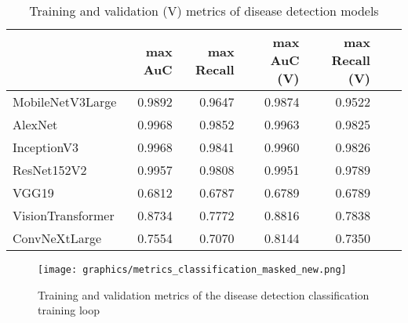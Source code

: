 \documentclass[draft,final]{vutinfth} %
\begin{document}
\begin{appendix}
\begin{table}[]
    \centering
    \begin{tabular}{lrrrrrr}
    \toprule
    & max AuC & max Recall & max AuC (V) & max Recall (V) \\
    \midrule
    MobileNetV3Large & 0.9892 & 0.9647 & 0.9874 & 0.9522 \\
    AlexNet & 0.9968 & 0.9852 & 0.9963 & 0.9825 \\
    InceptionV3 & 0.9968 & 0.9841 & 0.9960 & 0.9826 \\
    ResNet152V2 & 0.9957 & 0.9808 & 0.9951 & 0.9789 \\
    VGG19 & 0.6812 & 0.6787 & 0.6789 & 0.6789 \\
    VisionTransformer & 0.8734 & 0.7772 & 0.8816 & 0.7838 \\
    ConvNeXtLarge & 0.7554 & 0.7070 & 0.8144 & 0.7350 \\
    \bottomrule
    \end{tabular}
    \caption{Training and validation (V) metrics of disease detection models}
    \label{tab:disease_detection_metrics}
\end{table}

\begin{figure}
    \centering
    \texttt{[image: graphics/metrics\_classification\_masked\_new.png]}
    \caption{Training and validation metrics of the disease detection classification training loop}
    \label{fig:metrics_disease_detection_masked}
\end{figure}

\end{appendix}


\backmatter

\listoffigures %

\cleardoublepage %
\listoftables %


\printindex

\printglossaries

%
%
\printbibliography
\end{document}
